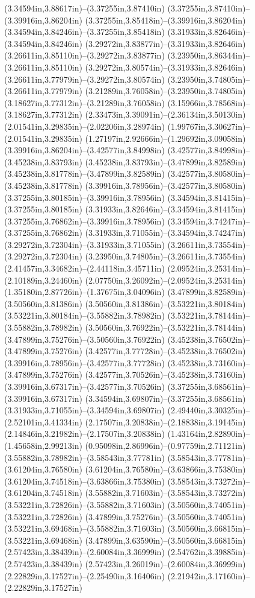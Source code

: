 (3.34594in,3.88617in)--(3.37255in,3.87410in) (3.37255in,3.87410in)--(3.39916in,3.86204in) (3.37255in,3.85418in)--(3.39916in,3.86204in) (3.34594in,3.84246in)--(3.37255in,3.85418in) (3.31933in,3.82646in)--(3.34594in,3.84246in) (3.29272in,3.83877in)--(3.31933in,3.82646in) (3.26611in,3.85110in)--(3.29272in,3.83877in) (3.23950in,3.86344in)--(3.26611in,3.85110in) (3.29272in,3.80574in)--(3.31933in,3.82646in) (3.26611in,3.77979in)--(3.29272in,3.80574in) (3.23950in,3.74805in)--(3.26611in,3.77979in) (3.21289in,3.76058in)--(3.23950in,3.74805in) (3.18627in,3.77312in)--(3.21289in,3.76058in) (3.15966in,3.78568in)--(3.18627in,3.77312in) (2.33473in,3.39091in)--(2.36134in,3.50130in) (2.01541in,3.29835in)--(2.02206in,3.28974in) (1.99767in,3.30627in)--(2.01541in,3.29835in) (1.27197in,2.92666in)--(1.29692in,3.09058in) (3.39916in,3.86204in)--(3.42577in,3.84998in) (3.42577in,3.84998in)--(3.45238in,3.83793in) (3.45238in,3.83793in)--(3.47899in,3.82589in) (3.45238in,3.81778in)--(3.47899in,3.82589in) (3.42577in,3.80580in)--(3.45238in,3.81778in) (3.39916in,3.78956in)--(3.42577in,3.80580in) (3.37255in,3.80185in)--(3.39916in,3.78956in) (3.34594in,3.81415in)--(3.37255in,3.80185in) (3.31933in,3.82646in)--(3.34594in,3.81415in) (3.37255in,3.76862in)--(3.39916in,3.78956in) (3.34594in,3.74247in)--(3.37255in,3.76862in) (3.31933in,3.71055in)--(3.34594in,3.74247in) (3.29272in,3.72304in)--(3.31933in,3.71055in) (3.26611in,3.73554in)--(3.29272in,3.72304in) (3.23950in,3.74805in)--(3.26611in,3.73554in) (2.41457in,3.34682in)--(2.44118in,3.45711in) (2.09524in,3.25314in)--(2.10189in,3.24460in) (2.07750in,3.26092in)--(2.09524in,3.25314in) (1.35180in,2.87726in)--(1.37675in,3.04096in) (3.47899in,3.82589in)--(3.50560in,3.81386in) (3.50560in,3.81386in)--(3.53221in,3.80184in) (3.53221in,3.80184in)--(3.55882in,3.78982in) (3.53221in,3.78144in)--(3.55882in,3.78982in) (3.50560in,3.76922in)--(3.53221in,3.78144in) (3.47899in,3.75276in)--(3.50560in,3.76922in) (3.45238in,3.76502in)--(3.47899in,3.75276in) (3.42577in,3.77728in)--(3.45238in,3.76502in) (3.39916in,3.78956in)--(3.42577in,3.77728in) (3.45238in,3.73160in)--(3.47899in,3.75276in) (3.42577in,3.70526in)--(3.45238in,3.73160in) (3.39916in,3.67317in)--(3.42577in,3.70526in) (3.37255in,3.68561in)--(3.39916in,3.67317in) (3.34594in,3.69807in)--(3.37255in,3.68561in) (3.31933in,3.71055in)--(3.34594in,3.69807in) (2.49440in,3.30325in)--(2.52101in,3.41334in) (2.17507in,3.20838in)--(2.18838in,3.19145in) (2.14846in,3.21982in)--(2.17507in,3.20838in) (1.43164in,2.82890in)--(1.45658in,2.99213in) (0.95098in,2.86996in)--(0.97759in,2.71121in) (3.55882in,3.78982in)--(3.58543in,3.77781in) (3.58543in,3.77781in)--(3.61204in,3.76580in) (3.61204in,3.76580in)--(3.63866in,3.75380in) (3.61204in,3.74518in)--(3.63866in,3.75380in) (3.58543in,3.73272in)--(3.61204in,3.74518in) (3.55882in,3.71603in)--(3.58543in,3.73272in) (3.53221in,3.72826in)--(3.55882in,3.71603in) (3.50560in,3.74051in)--(3.53221in,3.72826in) (3.47899in,3.75276in)--(3.50560in,3.74051in) (3.53221in,3.69468in)--(3.55882in,3.71603in) (3.50560in,3.66815in)--(3.53221in,3.69468in) (3.47899in,3.63590in)--(3.50560in,3.66815in) (2.57423in,3.38439in)--(2.60084in,3.36999in) (2.54762in,3.39885in)--(2.57423in,3.38439in) (2.57423in,3.26019in)--(2.60084in,3.36999in) (2.22829in,3.17527in)--(2.25490in,3.16406in) (2.21942in,3.17160in)--(2.22829in,3.17527in) 